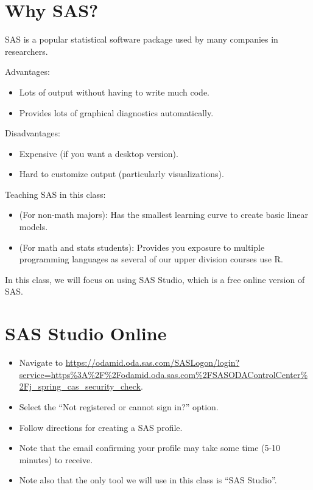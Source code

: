 \documentclass[12pt]{../notes}
\begin{document}

\section{Why SAS?}

SAS is a popular statistical software package used by many companies in researchers. 

\nspace
Advantages:
\begin{itemize}
\item Lots of output without having to write much code. 
\item Provides lots of graphical diagnostics automatically. 
\end{itemize}

\nspace
Disadvantages: 
\begin{itemize}
\item Expensive (if you want a desktop version).
\item Hard to customize output (particularly visualizations). 
\end{itemize}

\nspace
Teaching SAS in this class:
\begin{itemize}
\item (For non-math majors): Has the smallest learning curve to create basic linear models. 
\item (For math and stats students): Provides you exposure to multiple programming languages as several of our upper division courses use R.
\end{itemize}

In this class, we will focus on using SAS Studio, which is a free online version of SAS. 

\section{SAS Studio Online}
\begin{itemize}
\item Navigate to \url{https://odamid.oda.sas.com/SASLogon/login?service=https%3A%2F%2Fodamid.oda.sas.com%2FSASODAControlCenter%2Fj_spring_cas_security_check}.
\item Select the ``Not registered or cannot sign in?'' option. 
\item Follow directions for creating a SAS profile. 
\item Note that the email confirming your profile may take some time (5-10 minutes) to receive.
\item Note also that the only tool we will use in this class is ``SAS Studio''.
\end{itemize}
\end{document}
